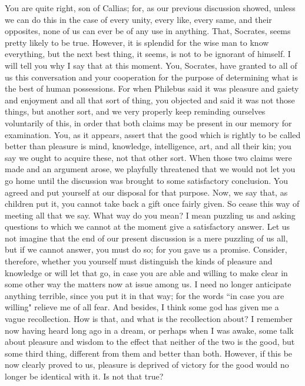 \documentclass[letterpaper,12pt]{article}
\newcommand{\stephpag}[1]{\marginnote{\small\itshape\fontfamily{ppl}\selectfont #1}}
\begin{document}
\begin{drama}
\socratesspeaks
You are quite right, son of Callias; for, as our previous discussion showed, unless we can do this in the case of every unity, every like, every same, and their opposites, none of us can ever be of any use in anything. \stephpag{c}
\protarchusspeaks
That, Socrates, seems pretty likely to be true. However, it is splendid for the wise man to know everything, but the next best thing, it seems, is not to be ignorant of himself. I will tell you why I say that at this moment. You, Socrates, have granted to all of us this conversation and your cooperation for the purpose of determining what is the best of human possessions. For when Philebus said it was pleasure and gaiety and enjoyment and all that sort of thing, you objected and said it was not those things, but another sort, \stephpag{d} and we very properly keep reminding ourselves voluntarily of this, in order that both claims may be present in our memory for examination. You, as it appears, assert that the good which is rightly to be called better than pleasure is mind, knowledge, intelligence, art, and all their kin; you say we ought to acquire these, not that other sort. When those two claims were made and an argument arose, we playfully threatened that we would not let you go home \stephpag{e} until the discussion was brought to some satisfactory conclusion. You agreed and put yourself at our disposal for that purpose. Now, we say that, as children put it, you cannot take back a gift once fairly given. So cease this way of meeting all that we say.
\socratesspeaks
What way do you mean? \stephpag{20 a}
\protarchusspeaks
I mean puzzling us and asking questions to which we cannot at the moment give a satisfactory answer. Let us not imagine that the end of our present discussion is a mere puzzling of us all, but if we cannot answer, you must do so; for you gave us a promise. Consider, therefore, whether you yourself must distinguish the kinds of pleasure and knowledge or will let that go, in case you are able and willing to make clear in some other way the matters now at issue among us. \stephpag{b}
\socratesspeaks
I need no longer anticipate anything terrible, since you put it in that way; for the words ``in case you are willing" relieve me of all fear. And besides, I think some god has given me a vague recollection.
\protarchusspeaks
How is that, and what is the recollection about?
\socratesspeaks
I remember now having heard long ago in a dream, or perhaps when I was awake, some talk about pleasure and wisdom to the effect that neither of the two is the good, but some third thing, different from them and better than both. \stephpag{c} However, if this be now clearly proved to us, pleasure is deprived of victory for the good would no longer be identical with it. Is not that true?

\end{drama}
\end{document}
